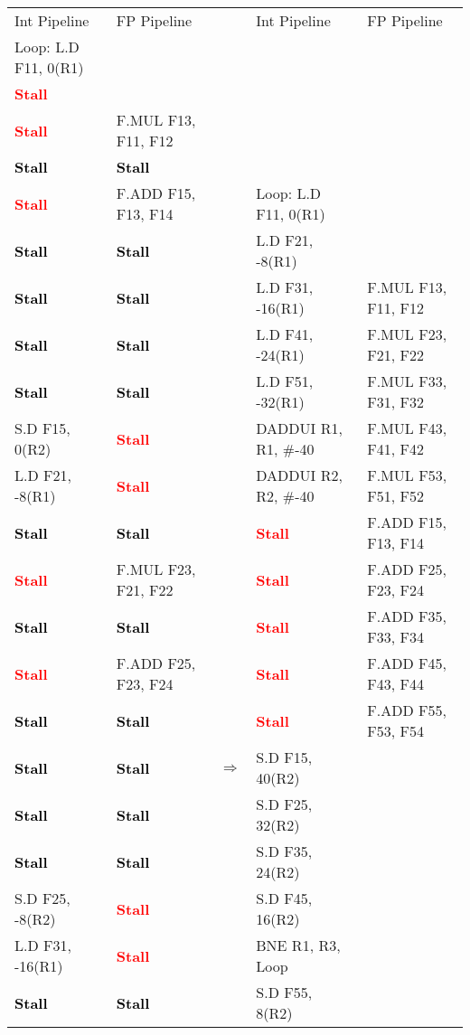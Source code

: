\documentclass[11pt]{article}
\newcommand{\code}[1]{\textsf{#1}}
\newcommand{\stall}{\textcolor{red}{\textbf{Stall}}}
\newcommand{\cellstall}{\cellcolor{red!25}\textcolor{black}{\textbf{Stall}}}
\begin{document}
\begin{table}[h]
\center
\small
\begin{tabular}{llcll}
	 Int Pipeline & FP Pipeline & & Int Pipeline & FP Pipeline \\
	 \code{Loop:} \code{L.D F11, 0(R1)} &  & & & \\
	 \stall &  & & & \\
	 \stall & \code{F.MUL F13, F11, F12} & & & \\
	 \cellstall & \cellstall & & & \\
	 \stall & \code{F.ADD F15, F13, F14} & & \code{Loop:} \code{L.D F11, 0(R1)} &  \\
	 \cellstall & \cellstall & & \code{L.D F21, -8(R1)} &  \\
	 \cellstall & \cellstall &  & \code{L.D F31, -16(R1)} & \code{F.MUL F13, F11, F12} \\
	 \cellstall & \cellstall & & \code{L.D F41, -24(R1)} & \code{F.MUL F23, F21, F22} \\
	 \cellstall & \cellstall & & \code{L.D F51, -32(R1)} & \code{F.MUL F33, F31, F32} \\
	 \code{S.D F15, 0(R2)} & \stall & & \code{DADDUI R1, R1, \#-40} & \code{F.MUL F43, F41, F42} \\
	 \code{L.D F21, -8(R1)} & \stall & & \code{DADDUI R2, R2, \#-40} & \code{F.MUL F53, F51, F52} \\
	 \cellstall & \cellstall & & \stall & \code{F.ADD F15, F13, F14} \\ 
	 \stall & \code{F.MUL F23, F21, F22} & & \stall & \code{F.ADD F25, F23, F24} \\
	 \cellstall & \cellstall & & \stall & \code{F.ADD F35, F33, F34} \\
	 \stall & \code{F.ADD F25, F23, F24} & & \stall & \code{F.ADD F45, F43, F44} \\
	 \cellstall & \cellstall & & \stall & \code{F.ADD F55, F53, F54} \\
	 \cellstall & \cellstall & $\Rightarrow$ & \code{S.D F15, 40(R2)} &   \\
	 \cellstall & \cellstall & & \code{S.D F25, 32(R2)} &  \\ 
	 \cellstall & \cellstall & & \code{S.D F35, 24(R2)} &  \\
	 \code{S.D F25, -8(R2)} & \stall & & \code{S.D F45, 16(R2)} &  \\
	 \code{L.D F31, -16(R1)} & \stall & & \code{BNE R1, R3, Loop} &  \\ 
	 \cellstall & \cellstall & &  \code{S.D F55, 8(R2)} &  \\	

\end{tabular}
\end{table}
\end{document}
